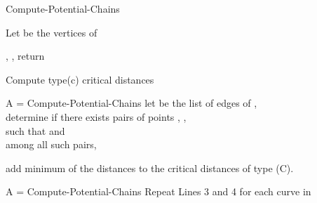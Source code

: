 \documentclass[12pt]{dalthesis}
\newcommand{\REM}[1]{}
\begin{document}
\begin{algorithm} [t]
\caption {\sc Compute-Potential-Chains } 
\label{alg:potentialChains}
\begin{algorithmic}[1]
	\vspace{0.5em}
	\baselineskip
	\STATE 
	\STATE Let  be the vertices of 

	\IF{}

	\STATE\label{l:0} 
	
	\STATE\label{l:0} 
	\WHILE{} \label{l:loopPot}

	\IF{}
	\STATE  
	\STATE , \ELSE 
	\STATE , \ENDIF
	\ENDWHILE
	\ENDIF
	\STATE  return 
	
	
\end{algorithmic}
\end{algorithm}









 \begin{algorithm} [t]
\caption {\sc Compute type(c) critical distances} \label{alg:typeCFinal}
\begin{algorithmic}[1]

\STATE A = {\sc Compute-Potential-Chains}
\STATE let  be the list of edges of , \\
 determine if there exists pairs of points , , \\
such that  and 
\\
among all such pairs, 

add  minimum of the distances  to the critical distances of type (C).
\ENDFOR	
\ENDFOR	


\STATE A = {\sc Compute-Potential-Chains}
\STATE Repeat Lines 3 and 4 for each curve  in  \label{l:reprep} \ENDFOR	

\REM{
\FOR { each }
\STATE B = 
\FOR{each curve  in B}
\STATE determine if a point  exists on the first edge of , \\
and a point  exists on the last edge of , \\
such that . \\
if exists, add distance  to critical distance of type (C)

\ENDFOR	
\ENDFOR		
}

\end{algorithmic}
\end{algorithm}
\end{document}
